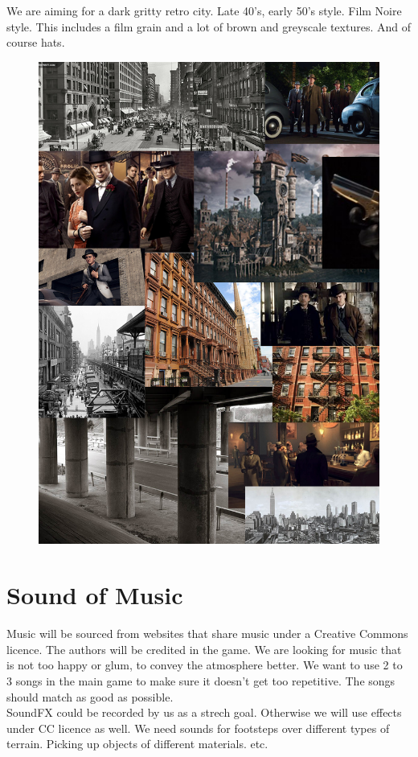 \documentclass{article}
\begin{document}
	\newpage
	We are aiming for a dark gritty retro city. Late 40's, early 50's style. Film Noire style. This includes a film grain and a lot of brown and greyscale textures. And of course hats.
	\begin{figure}[ht!]
		\centering
		\centerline{\includegraphics[width=120mm]{images/collage.png}}
	\end{figure}
	\newpage


\section{Sound of Music}
	Music will be sourced from websites that share music under a Creative Commons licence. The authors will be credited in the game. We are looking for music that is not too happy or glum, to convey the atmosphere better. We want to use 2 to 3 songs in the main game to make sure it doesn't get too repetitive. The songs should match as good as possible.\\
	SoundFX could be recorded by us as a strech goal. Otherwise we will use effects under CC licence as well. We need sounds for footsteps over different types of terrain. Picking up objects of different materials. etc.
\end{document}
